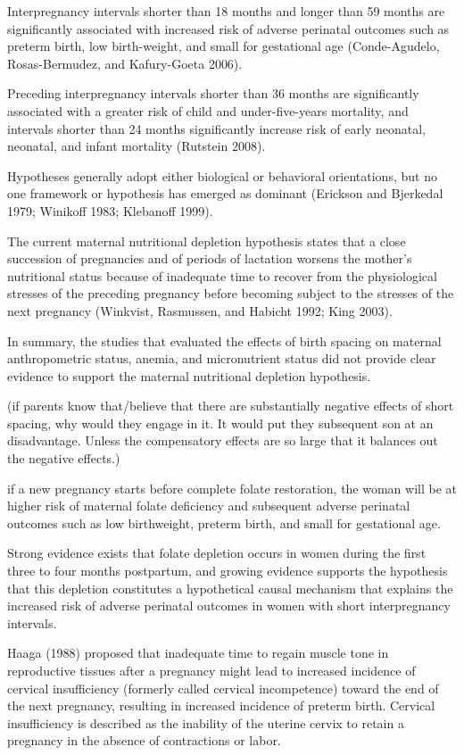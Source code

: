 Interpregnancy intervals shorter than 18 months and longer than 59
months are significantly associated with increased risk of adverse
perinatal outcomes such as preterm birth, low birth-weight, and small
for gestational age (Conde-Agudelo, Rosas-Bermudez, and Kafury-Goeta
2006).

Preceding interpregnancy intervals shorter than 36 months are
significantly associated with a greater risk of child and
under-five-years mortality, and intervals shorter than 24 months
significantly increase risk of early neonatal, neonatal, and infant
mortality (Rutstein 2008).

Hypotheses generally adopt either biological or behavioral orientations,
but no one framework or hypothesis has emerged as dominant (Erickson and
Bjerkedal 1979; Winikoff 1983; Klebanoff 1999).

The current maternal nutritional depletion hypothesis states that a
close succession of pregnancies and of periods of lactation worsens the
mother’s nutritional status because of inadequate time to recover from
the physiological stresses of the preceding pregnancy before becoming
subject to the stresses of the next pregnancy (Winkvist, Rasmussen, and
Habicht 1992; King 2003).

In summary, the studies that evaluated the effects of birth spacing on
maternal anthropometric status, anemia, and micronutrient status did not
provide clear evidence to support the maternal nutritional depletion
hypothesis.

(if parents know that/believe that there are substantially negative 
effects of short spacing, why would they engage in it. It would put
they subsequent son at an disadvantage. Unless the compensatory effects
are so large that it balances out the negative effects.)

if a new pregnancy starts before complete folate restoration, the woman
will be at higher risk of maternal folate deficiency and subsequent
adverse perinatal outcomes such as low birthweight, preterm birth, and
small for gestational age.

Strong evidence exists that folate depletion occurs in women during the
first three to four months postpartum, and growing evidence supports the
hypothesis that this depletion constitutes a hypothetical causal
mechanism that explains the increased risk of adverse perinatal outcomes
in women with short interpregnancy intervals.

Haaga (1988) proposed that inadequate time to regain muscle tone in
reproductive tissues after a pregnancy might lead to increased incidence
of cervical insufficiency (formerly called cervical incompetence) toward
the end of the next pregnancy, resulting in increased incidence of
preterm birth. Cervical insufficiency is described as the inability of
the uterine cervix to retain a pregnancy in the absence of contractions
or labor.

